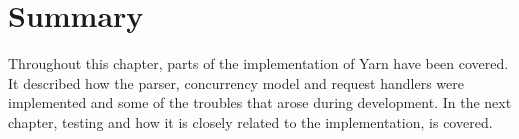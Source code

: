 \section{Summary} %
Throughout this chapter, parts of the implementation of Yarn have been covered.
It described how the parser, concurrency model and request handlers were
implemented and some of the troubles that arose during development. In the
next chapter, testing and how it is closely related to the implementation, is
covered.
